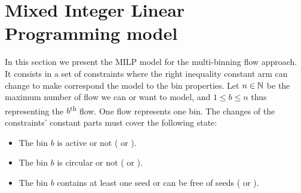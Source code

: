 \section{Mixed Integer Linear Programming model}

In this section we present the MILP model for the multi-binning flow approach.
It consists in a set of constraints where the right inequality constant arm can change to make correspond the model to the bin properties.
Let \(n \in \mathbb{N}{}\) be the maximum number of flow we can or want to model, and \(1 \leq b \leq n\) thus representing the \(b\)\textsuperscript{th} flow.
One flow represents one bin.
The changes of the constraints' constant parts must cover the following state:

\begin{itemize}
  \item The bin \(b\) is active or not (\mfbOn{} or \mfbOff{}).
  \item The bin \(b\) is circular or not (\mfbC{} or \mfbPC{}).
  \item The bin \(b\) contains at least one seed or can be free of seeds (\mfbS{} or \mfbFS{}).
\end{itemize}

